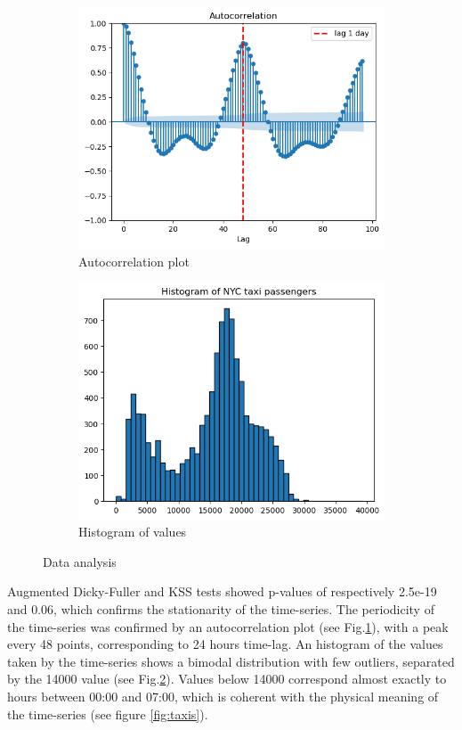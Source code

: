 \documentclass[11pt]{article}
\begin{document}
\begin{figure}[h]
    \centering
    \begin{subfigure}[b]{0.45\textwidth}
        \includegraphics[width=\textwidth]{autocorrelation.png}
        \caption{Autocorrelation plot}
        \label{fig:autocorrelation}
    \end{subfigure}
    \hfill
    \begin{subfigure}[b]{0.45\textwidth}
        \includegraphics[width=\textwidth]{histograms.png}
        \caption{Histogram of values}
        \label{fig:histograms}
    \end{subfigure}
    \caption{Data analysis}
    \label{fig:data_analysis}
\end{figure}
Augmented Dicky-Fuller and KSS tests showed p-values of respectively 2.5e-19 and 0.06, which confirms the stationarity of the time-series. 
The periodicity of the time-series was confirmed by an autocorrelation plot  (see Fig.\ref{fig:autocorrelation}), with a peak every 48 points, corresponding to 24 hours time-lag. 
An histogram of the values taken by the time-series shows a bimodal distribution with few outliers, separated by the 14000 value (see Fig.\ref{fig:histograms}). 
Values below 14000 correspond almost exactly to hours between 00:00 and 07:00, which is coherent with the physical meaning of the time-series (see figure \ref{fig:taxis}).
\end{document}
